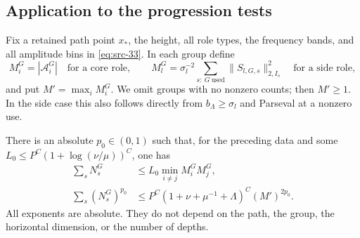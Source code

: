 \subsection{Application to the progression tests}

Fix a retained path point $x_*$, the height, all role types, the
frequency bands, and all amplitude bins in \eqref{eq:src-33}.
In each group define
\[
 M_i^G=|\mathcal A_i^G|\quad\text{for a core role},\qquad
 M_l^G=\sigma_l^{-2}
       \sum_{s:\ G\ \mathrm{used}}
                   \|S_{l,G,s}\|_{2,I_s}^2
       \quad\text{for a side role},
\]
and put $M'=\max_iM_i^G$.  We omit groups with no nonzero counts;
then $M'\geq1$.  In the side case this also follows directly from
$b_\Lambda\geq\sigma_l$ and Parseval at a nonzero use.

\begin{proposition}
\label{prop:thin-count}
There is an absolute $p_0\in(0,1)$ such that, for the preceding
data and some
$L_0\leq P^C(1+\log(\nu/\mu))^C$, one has
\begin{equation*}
 \begin{split}
 \sum_sN_s^G
     &\leq L_0\min_{i\ne j}M_i^GM_j^G,\\
 \sum_s(N_s^G)^{p_0}
     &\leq P^C(1+\nu+\mu^{-1}+\Lambda)^C(M')^{2p_0}.
 \end{split}
 \tag{34}\label{eq:src-34}
\end{equation*}
All exponents are absolute.  They do not depend on the path,
the group, the horizontal dimension, or the number of depths.
\end{proposition}

